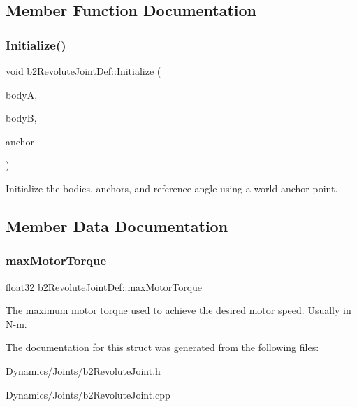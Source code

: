 \subsection{Member Function Documentation}
\mbox{\label{structb2RevoluteJointDef_a6401b2a663533415d032a525e4fa2806}} 
\subsubsection{\texorpdfstring{Initialize()}{Initialize()}}
{\footnotesize\ttfamily void b2\+Revolute\+Joint\+Def\+::\+Initialize (\begin{DoxyParamCaption}\item[{\mbox{\hyperlink{classb2Body}{b2\+Body}} $\ast$}]{bodyA,  }\item[{\mbox{\hyperlink{classb2Body}{b2\+Body}} $\ast$}]{bodyB,  }\item[{const \mbox{\hyperlink{structb2Vec2}{b2\+Vec2}} \&}]{anchor }\end{DoxyParamCaption})}

Initialize the bodies, anchors, and reference angle using a world anchor point. 

\subsection{Member Data Documentation}
\mbox{\label{structb2RevoluteJointDef_a9fc1b67fe6d1bc31f88cc2cfd681fe30}} 
\subsubsection{\texorpdfstring{max\+Motor\+Torque}{maxMotorTorque}}
{\footnotesize\ttfamily float32 b2\+Revolute\+Joint\+Def\+::max\+Motor\+Torque}

The maximum motor torque used to achieve the desired motor speed. Usually in N-\/m. 

The documentation for this struct was generated from the following files\+:\begin{DoxyCompactItemize}
\item 
Dynamics/\+Joints/b2\+Revolute\+Joint.\+h\item 
Dynamics/\+Joints/b2\+Revolute\+Joint.\+cpp\end{DoxyCompactItemize}
